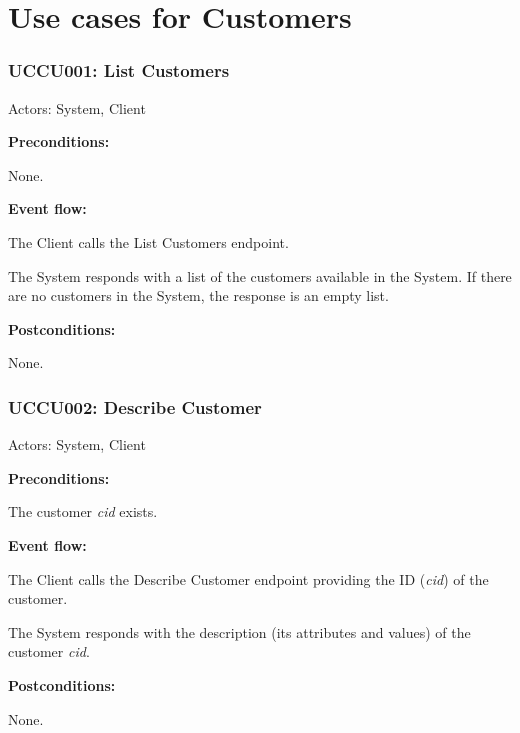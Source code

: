 \section{Use cases for Customers}

\begin{ucbox}{\subsubsection{UCCU001: List Customers}}
\label{UCCU001}

Actors: System, Client

\textbf{Preconditions:}

\ucitem None.

\textbf{Event flow:}

\ucitem The Client calls the List Customers endpoint.

\ucitem The System responds with a list of the customers available in the System. If there are no customers in the System, the response is an empty list.

\textbf{Postconditions:}

\ucitem None.

\end{ucbox}

\begin{ucbox}{\subsubsection{UCCU002: Describe Customer}}
\label{UCCU002}

Actors: System, Client

\textbf{Preconditions:}

\ucitem The customer \textit{cid} exists.

\textbf{Event flow:}

\ucitem The Client calls the Describe Customer endpoint providing the ID (\textit{cid}) of the customer.

\ucitem The System responds with the description (its attributes and values) of the customer \textit{cid}.

\textbf{Postconditions:}

\ucitem None.

\end{ucbox}

